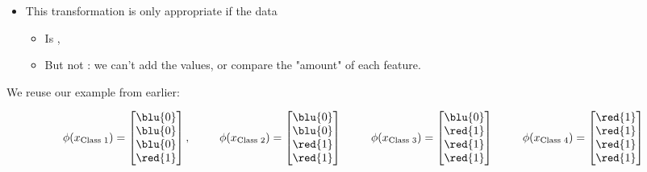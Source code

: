 \begin{definition}
                    \phantom{}

                    \begin{itemize}
                        \item This transformation is only appropriate if the data 
                            \begin{itemize}
                                \item Is ,
                                \item But not : we can't add the values, or compare the "amount" of each feature.
                            \end{itemize}
                    \end{itemize}
                \end{definition}

                \miniex We reuse our example from earlier: 

                \begin{equation*}
                    \phi(x_{\text{Class 1}}) =
                    \begin{bmatrix}
                        \blu{0} \\ \blu{0} \\ \blu{0} \\ \red{1}
                    \end{bmatrix},
                    \qquad \;\;
                    \phi(x_{\text{Class 2}}) =
                    \begin{bmatrix}
                        \blu{0} \\ \blu{0} \\ \red{1} \\ \red{1}
                    \end{bmatrix}
                    \qquad \;\;
                    \phi(x_{\text{Class 3}}) =
                    \begin{bmatrix}
                        \blu{0} \\ \red{1} \\ \red{1} \\ \red{1}
                    \end{bmatrix}
                    \qquad \;\;
                    \phi(x_{\text{Class 4}}) =
                    \begin{bmatrix}
                        \red{1} \\ \red{1} \\ \red{1} \\ \red{1}
                    \end{bmatrix}
                \end{equation*}

